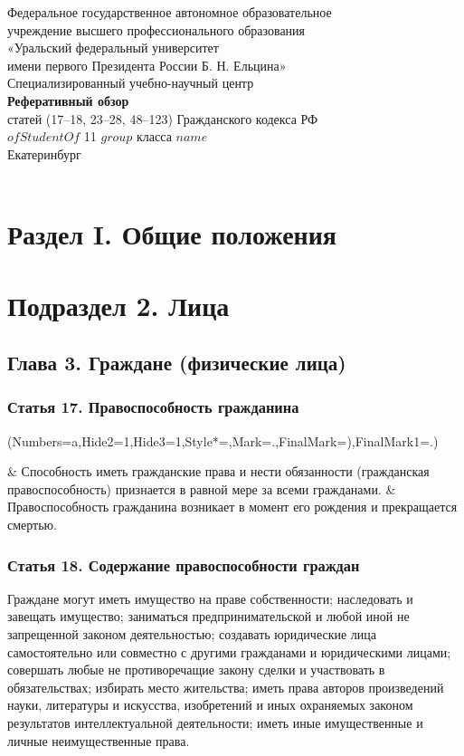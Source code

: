 \documentclass{report}
\newcommand{\beginEasyList}{
        \begin{easylist}[enumerate]
            \ListProperties(Numbers=a,Hide2=1,Hide3=1,Style*=,Mark=.,FinalMark={)},FinalMark1=.)
    }
\newcommand{\eEasyList}{\end{easylist}}
\begin{document}
\begin{titlepage}
    \center
    \Large

    Федеральное государственное автономное образовательное\\
    учреждение высшего профессионального образования\\
    «Уральский федеральный университет\\
    имени первого Президента России Б. Н. Ельцина»\\
    Специализированный учебно-научный центр\\

    \vfill
    \textbf{Реферативный обзор}\\
    статей (17--18, 23--28, 48--123) Гражданского кодекса РФ\\
    $ofStudentOf$ 11 $group$ класса $name$\\

    \vfill
    {Екатеринбург}\\
    {\the\year}\\
\end{titlepage}

\section{{\bf Раздел I. Общие положения}}
\section{{\bf Подраздел 2. Лица}}
\subsection{{\bf Глава 3. Граждане (физические лица)}}

\subsubsection{{\bf Статья 17.} Правоспособность гражданина}
\beginEasyList
& Способность иметь гражданские права и нести обязанности (гражданская правоспособность) признается в равной мере за всеми гражданами.
& Правоспособность гражданина возникает в момент его рождения и прекращается смертью.
\eEasyList
\subsubsection{{\bf Статья 18.} Содержание правоспособности граждан}
\par Граждане могут иметь имущество на праве собственности; наследовать и завещать имущество; заниматься предпринимательской и любой иной не запрещенной законом деятельностью; создавать юридические лица самостоятельно или совместно с другими гражданами и юридическими лицами; совершать любые не противоречащие закону сделки и участвовать в обязательствах; избирать место жительства; иметь права авторов произведений науки, литературы и искусства, изобретений и иных охраняемых законом результатов интеллектуальной деятельности; иметь иные имущественные и личные неимущественные права.
\end{document}
